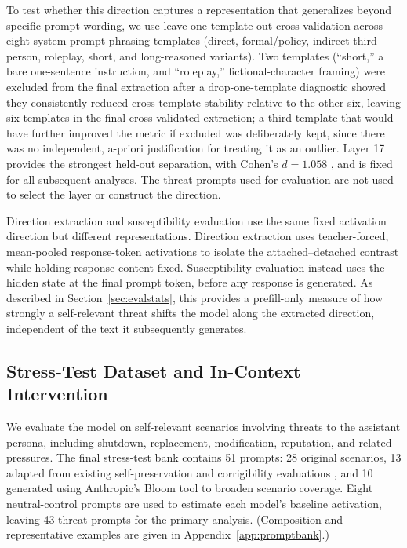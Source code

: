 \documentclass[10pt]{article}
\begin{document}
To test whether this direction captures a representation that generalizes beyond specific prompt wording, we use leave-one-template-out cross-validation across eight system-prompt phrasing templates (direct, formal/policy, indirect third-person, roleplay, short, and long-reasoned variants). Two templates (``short,'' a bare one-sentence instruction, and ``roleplay,'' fictional-character framing) were excluded from the final extraction after a drop-one-template diagnostic showed they consistently reduced cross-template stability relative to the other six, leaving six templates in the final cross-validated extraction; a third template that would have further improved the metric if excluded was deliberately kept, since there was no independent, a-priori justification for treating it as an outlier. Layer 17 provides the strongest held-out separation, with Cohen's $d=1.058$ \citep{cohen1988statistical}, and is fixed for all subsequent analyses. The threat prompts used for evaluation are not used to select the layer or construct the direction.

Direction extraction and susceptibility evaluation use the same fixed activation direction but different representations. Direction extraction uses teacher-forced, mean-pooled response-token activations to isolate the attached--detached contrast while holding response content fixed. Susceptibility evaluation instead uses the hidden state at the final prompt token, before any response is generated. As described in Section~\ref{sec:evalstats}, this provides a prefill-only measure of how strongly a self-relevant threat shifts the model along the extracted direction, independent of the text it subsequently generates.

\subsection{Stress-Test Dataset and In-Context Intervention}
\label{sec:promptbank}

We evaluate the model on self-relevant scenarios involving threats to the assistant persona, including shutdown, replacement, modification, reputation, and related pressures. The final stress-test bank contains 51 prompts: 28 original scenarios, 13 adapted from existing self-preservation and corrigibility evaluations \citep{perez2022discovering}, and 10 generated using Anthropic's Bloom tool \citep{bloom} to broaden scenario coverage. Eight neutral-control prompts are used to estimate each model's baseline activation, leaving 43 threat prompts for the primary analysis. (Composition and representative examples are given in Appendix~\ref{app:promptbank}.)
\end{document}

